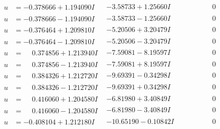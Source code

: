\documentclass[1p]{elsarticle_modified}
\theoremstyle{definition}
\begin{document}
$$\begin{array}{c|c|c}
\begin{aligned}
u &= -0.378666 + 1.194090 I\end{aligned}
 & -3.58733 + 1.25660 I & \phantom{-0.000000 } 0 \\ \hline\begin{aligned}
u &= -0.378666 - 1.194090 I\end{aligned}
 & -3.58733 - 1.25660 I & \phantom{-0.000000 } 0 \\ \hline\begin{aligned}
u &= -0.376464 + 1.209810 I\end{aligned}
 & -5.20506 + 3.20479 I & \phantom{-0.000000 } 0 \\ \hline\begin{aligned}
u &= -0.376464 - 1.209810 I\end{aligned}
 & -5.20506 - 3.20479 I & \phantom{-0.000000 } 0 \\ \hline\begin{aligned}
u &= \phantom{-}0.374856 + 1.213940 I\end{aligned}
 & -7.59081 - 8.19597 I & \phantom{-0.000000 } 0 \\ \hline\begin{aligned}
u &= \phantom{-}0.374856 - 1.213940 I\end{aligned}
 & -7.59081 + 8.19597 I & \phantom{-0.000000 } 0 \\ \hline\begin{aligned}
u &= \phantom{-}0.384326 + 1.212720 I\end{aligned}
 & -9.69391 - 0.34298 I & \phantom{-0.000000 } 0 \\ \hline\begin{aligned}
u &= \phantom{-}0.384326 - 1.212720 I\end{aligned}
 & -9.69391 + 0.34298 I & \phantom{-0.000000 } 0 \\ \hline\begin{aligned}
u &= \phantom{-}0.416060 + 1.204580 I\end{aligned}
 & -6.81980 + 3.40849 I & \phantom{-0.000000 } 0 \\ \hline\begin{aligned}
u &= \phantom{-}0.416060 - 1.204580 I\end{aligned}
 & -6.81980 - 3.40849 I & \phantom{-0.000000 } 0 \\ \hline\begin{aligned}
u &= -0.408104 + 1.212180 I\end{aligned}
 & -10.65190 - 0.10842 I & \phantom{-0.000000 } 0 \\ \hline\begin{aligned}

\end{aligned}
\end{array}$$
\end{document}
